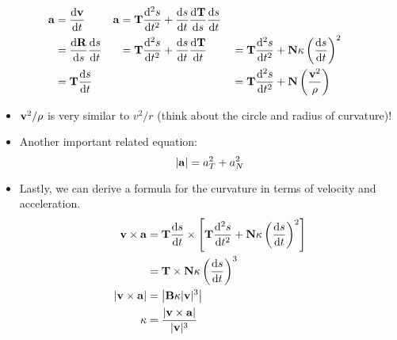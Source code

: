 \documentclass[../main.tex]{subfiles}
\begin{document}
\begin{itemize}
\begin{align*}
            \vb{a} &= \dv{\vb{v}}{t}&
                \vb{a} &= \vb{T}\dv[2]{s}{t}+\dv{s}{t}\dv{\vb{T}}{s}\dv{s}{t}\\
        &= \dv{\vb{R}}{s}\dv{s}{t}&
            &= \vb{T}\dv[2]{s}{t}+\dv{s}{t}\dv{\vb{T}}{t}&
                &= \vb{T}\dv[2]{s}{t}+\vb{N}\kappa\left( \dv{s}{t} \right)^2\\
        &= \vb{T}\dv{s}{t}&
            &&
                &= \vb{T}\dv[2]{s}{t}+\vb{N}\left( \frac{\vb{v}^2}{\rho} \right)
    \end{align*}
    \begin{itemize}
        \item $\vb{v}^2/\rho$ is very similar to $v^2/r$ (think about the circle and radius of curvature)!
        \item Another important related equation:
        \begin{equation*}
            |\vb{a}| = a_T^2+a_N^2
        \end{equation*}
        \item Lastly, we can derive a formula for the curvature in terms of velocity and acceleration.
        \begin{align*}
            \vb{v}\times\vb{a} &= \vb{T}\dv{s}{t}\times\left[ \vb{T}\dv[2]{s}{t}+\vb{N}\kappa\left( \dv{s}{t} \right)^2 \right]\\
            &= \vb{T}\times\vb{N}\kappa\left( \dv{s}{t} \right)^3\\
            |\vb{v}\times\vb{a}| &= \left| \vb{B}\kappa|\vb{v}|^3 \right|\\
            \kappa &= \frac{|\vb{v}\times\vb{a}|}{|\vb{v}|^3}
        \end{align*}
    \end{itemize}
\end{itemize}
\end{document}
